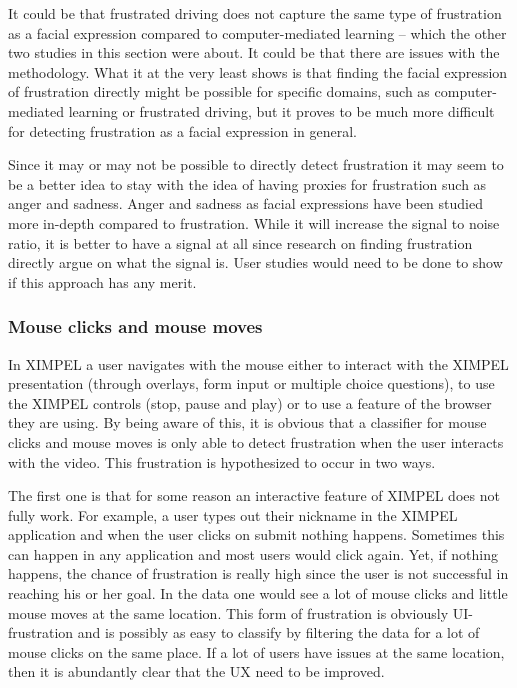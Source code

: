 It could be that frustrated driving does not capture the same type of frustration as a facial expression compared to computer-mediated learning -- which the other two studies in this section were about. It could be that there are issues with the methodology. What it at the very least shows is that finding the facial expression of frustration directly might be possible for specific domains, such as computer-mediated learning or frustrated driving, but it proves to be much more difficult for detecting frustration as a facial expression in general. 

Since it may or may not be possible to directly detect frustration it may seem to be a better idea to stay with the idea of having proxies for frustration such as anger and sadness. Anger and sadness as facial expressions have been studied more in-depth compared to frustration. While it will increase the signal to noise ratio, it is better to have a signal at all since research on finding frustration directly argue on what the signal is. User studies would need to be done to show if this approach has any merit.

\subsubsection{Mouse clicks and mouse moves}
In XIMPEL a user navigates with the mouse either to interact with the XIMPEL presentation (through overlays, form input or multiple choice questions), to use the XIMPEL controls (stop, pause and play) or to use a feature of the browser they are using. By being aware of this, it is obvious that a classifier for mouse clicks and mouse moves is only able to detect frustration when the user interacts with the video. This frustration is hypothesized to occur in two ways. 

The first one is that for some reason an interactive feature of XIMPEL does not fully work. For example, a user types out their nickname in the XIMPEL application and when the user clicks on submit nothing happens. Sometimes this can happen in any application and most users would click again. Yet, if nothing happens, the chance of frustration is really high since the user is not successful in reaching his or her goal. In the data one would see a lot of mouse clicks and little mouse moves at the same location. This form of frustration is obviously UI-frustration and is possibly as easy to classify by filtering the data for a lot of mouse clicks on the same place. If a lot of users have issues at the same location, then it is abundantly clear that the UX need to be improved.

